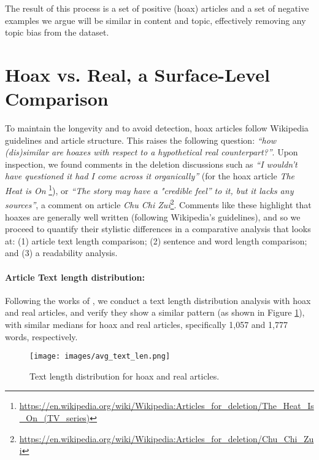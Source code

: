 The result of this process is a set of positive (hoax) articles and a set of negative examples we argue will be similar in content and topic, effectively removing any topic bias from the dataset.

\section{Hoax vs. Real, a Surface-Level Comparison}

To maintain the longevity and to avoid detection, hoax articles follow Wikipedia guidelines and article structure. This raises the following question: \emph{``how (dis)similar are hoaxes with respect to a hypothetical real counterpart?''}. Upon inspection, we found comments in the deletion discussions such as \emph{``I wouldn't have questioned it had I come across it organically''} (for the hoax article \textit{The Heat is On} \footnote{\url{https://en.wikipedia.org/wiki/Wikipedia:Articles_for_deletion/The_Heat_Is_On_(TV_series)}}), or \emph{``The story may have a "credible feel'' to it, but it lacks any sources''}, a comment on article \textit{Chu Chi Zui}\footnote{\url{https://en.wikipedia.org/wiki/Wikipedia:Articles_for_deletion/Chu_Chi_Zui}}. Comments like these highlight that hoaxes are generally well written (following Wikipedia's guidelines), and so we proceed to quantify their stylistic differences in a comparative analysis that looks at: (1) article text length comparison; (2) sentence and word length comparison; and (3) a readability analysis. 
\noindent\paragraph{\textbf{Article Text length distribution:}} Following the works of \citet{kumar2016disinformation}, we conduct a text length distribution analysis with hoax and real articles, and verify they show a similar pattern (as shown in Figure \ref{fig:text_len}), with similar medians for hoax and real articles, specifically 1,057 and 1,777 words, respectively. 


        \begin{figure}[h]
            \centering
            \texttt{[image: images/avg\_text\_len.png]}
            \caption{Text length distribution for hoax and real articles.}
            \label{fig:text_len}
        \end{figure}


